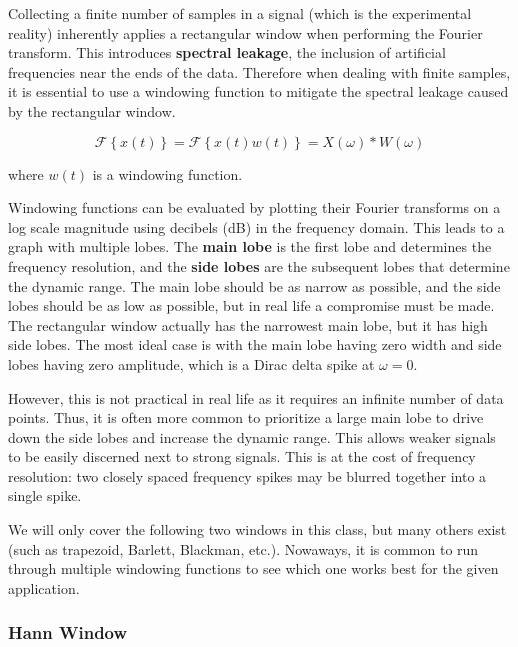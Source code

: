Collecting a finite number of samples in a signal (which is the experimental reality) inherently applies a rectangular window when performing the Fourier transform. This introduces \textbf{spectral leakage}, the inclusion of artificial frequencies near the ends of the data. Therefore when dealing with finite samples, it is essential to use a windowing function to mitigate the spectral leakage caused by the rectangular window.

\begin{equation*}
    \mathcal{F}\left\{x(t)\right\} = \mathcal{F}\left\{x(t)w(t)\right\} = X(\omega) \ast W(\omega)
\end{equation*}

where $w(t)$ is a windowing function.

\vsp

Windowing functions can be evaluated by plotting their Fourier transforms on a log scale magnitude using decibels (dB) in the frequency domain. This leads to a graph with multiple lobes. The \textbf{main lobe} is the first lobe and determines the frequency resolution, and the \textbf{side lobes} are the subsequent lobes that determine the dynamic range. The main lobe should be as narrow as possible, and the side lobes should be as low as possible, but in real life a compromise must be made. The rectangular window actually has the narrowest main lobe, but it has high side lobes. The most ideal case is with the main lobe having zero width and side lobes having zero amplitude, which is a Dirac delta spike at $\omega = 0$.

\vsp

However, this is not practical in real life as it requires an infinite number of data points. Thus, it is often more common to prioritize a large main lobe to drive down the side lobes and increase the dynamic range. This allows weaker signals to be easily discerned next to strong signals. This is at the cost of frequency resolution: two closely spaced frequency spikes may be blurred together into a single spike.

\vsp

We will only cover the following two windows in this class, but many others exist (such as trapezoid, Barlett, Blackman, etc.). Nowaways, it is common to run through multiple windowing functions to see which one works best for the given application.

\subsubsection{Hann Window}

